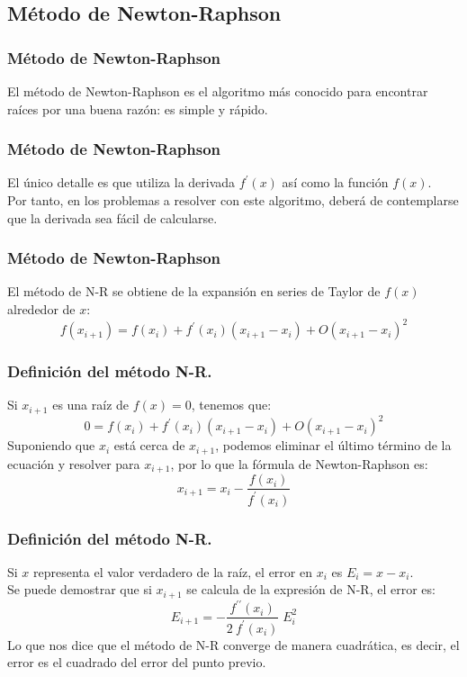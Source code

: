 \subsection{Método de Newton-Raphson}
\begin{frame}
\frametitle{Método de Newton-Raphson}
El método de Newton-Raphson es el algoritmo más conocido para encontrar raíces por una buena razón: es simple y rápido.
\end{frame}
\begin{frame}
\frametitle{Método de Newton-Raphson}
El único detalle es que utiliza la derivada $f^{\prime}(x)$ así como la función $f(x)$.
\\
\bigskip
Por tanto, en los problemas a resolver con este algoritmo, deberá de contemplarse que la derivada sea fácil de calcularse.
\end{frame}
\begin{frame}
\frametitle{Método de Newton-Raphson}
El método de N-R se obtiene de la expansión en series de Taylor de $f(x)$ alrededor de $x$:
\[ f(x_{i + 1})  = f(x_{i}) + f^{\prime}(x_{i})(x_{i + 1} - x_{i}) + O(x_{i + 1} - x_{i})^{2}\]
\end{frame}
\begin{frame}
\frametitle{Definición del método N-R.}
Si $x_{i + 1}$ es una raíz de $f(x)=0$, tenemos que:
\[ 0 = f(x_{i}) + f^{\prime}(x_{i})(x_{i + 1} - x_{i}) + O(x_{i + 1} - x_{i})^{2} \]
Suponiendo que $x_{i}$ está cerca de $x_{i + 1}$, podemos eliminar el último término de la ecuación y resolver para $x_{i+1}$, por lo que la fórmula de Newton-Raphson es:
\[ x_{i+1} = x_{i} - \dfrac{f(x_{i})}{f^{\prime}(x_{i})} \]
\end{frame}
\begin{frame}
\frametitle{Definición del método N-R.}
Si $x$ representa el valor verdadero de la raíz, el error en $x_{i}$ es $E_{i} =x - x_{i}$. 
\\
\bigskip
Se puede demostrar que si $x_{i + 1}$ se calcula de la expresión de N-R, el error es:
\[ E_{i + 1} = - \dfrac{f^{\prime \prime}(x_{i})}{2 \: f^{\prime}(x_{i})} \; E_{i}^{2}\]
Lo que nos dice que el método de N-R converge de manera cuadrática, es decir, el error es el cuadrado del error del punto previo.
\end{frame}
